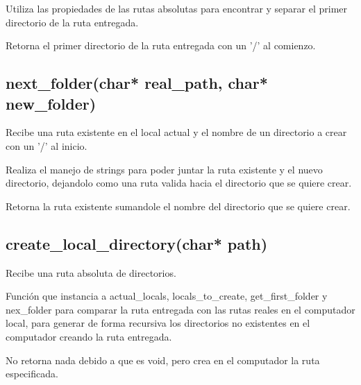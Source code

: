 \documentclass[12pt]{article}
\begin{document}
Utiliza las propiedades de las rutas absolutas para encontrar y separar el primer directorio de la ruta entregada.

Retorna el primer directorio de la ruta entregada con un '/' al comienzo.

\subsection{next\_folder(char* real\_path, char* new\_folder)}
Recibe una ruta existente en el local actual y el nombre de un directorio a crear con un '/' al inicio.

Realiza el manejo de strings para poder juntar la ruta existente y el nuevo directorio, dejandolo como una ruta valida hacia el directorio que se quiere crear. 

Retorna la ruta existente sumandole el nombre del directorio que se quiere crear.

\subsection{create\_local\_directory(char* path)}
Recibe una ruta absoluta de directorios.

Función que instancia a actual\_locals, locals\_to\_create, get\_first\_folder y nex\_folder para comparar la ruta entregada con las rutas reales en el computador local, para generar de forma recursiva los directorios no existentes en el computador creando la ruta entregada.

No retorna nada debido a que es void, pero crea en el computador la ruta especificada.

\end{document}
